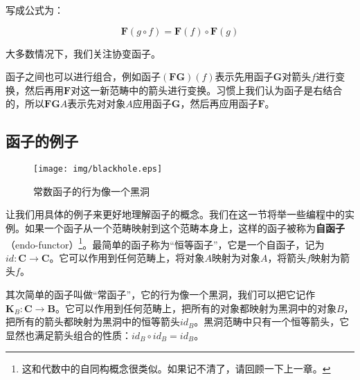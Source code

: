 \documentclass{article}
\begin{document}
\begin{itemize}
\begin{center}
\end{center}

写成公式为：

\[
\mathbf{F}(g \circ f) = \mathbf{F}(f) \circ \mathbf{F}(g)
\]

大多数情况下，我们关注协变函子。
\end{itemize}

函子之间也可以进行组合，例如函子$(\mathbf{F} \mathbf{G})(f)$表示先用函子$\mathbf{G}$对箭头$f$进行变换，然后再用$\mathbf{F}$对这一新范畴中的箭头进行变换。习惯上我们认为函子是右结合的，所以$\mathbf{F}\mathbf{G}A$表示先对对象$A$应用函子$\mathbf{G}$，然后再应用函子$\mathbf{F}$。

\subsection{函子的例子}

\begin{wrapfigure}{R}{0.3\textwidth}
 \centering
 \texttt{[image: img/blackhole.eps]}
 \captionsetup{labelformat=empty}
 \caption{常数函子的行为像一个黑洞}
 \label{fig:blackhole}
\end{wrapfigure}

让我们用具体的例子来更好地理解函子的概念。我们在这一节将举一些编程中的实例。如果一个函子从一个范畴映射到这个范畴本身上，这样的函子被称为\textbf{自函子}（endo-functor）\footnote{这和代数中的自同构概念很类似。如果记不清了，请回顾一下上一章。}。最简单的函子称为“恒等函子”，它是一个自函子，记为$id: \pmb{C} \to \pmb{C}$。它可以作用到任何范畴上，将对象$A$映射为对象$A$，将箭头$f$映射为箭头$f$。

其次简单的函子叫做“常函子”，它的行为像一个黑洞，我们可以把它记作$\mathbf{K}_B : \pmb{C} \to \pmb{B}$。它可以作用到任何范畴上，把所有的对象都映射为黑洞中的对象$B$，把所有的箭头都映射为黑洞中的恒等箭头$id_B$。黑洞范畴中只有一个恒等箭头，它显然也满足箭头组合的性质：$id_B \circ id_B = id_B$。
\end{document}
